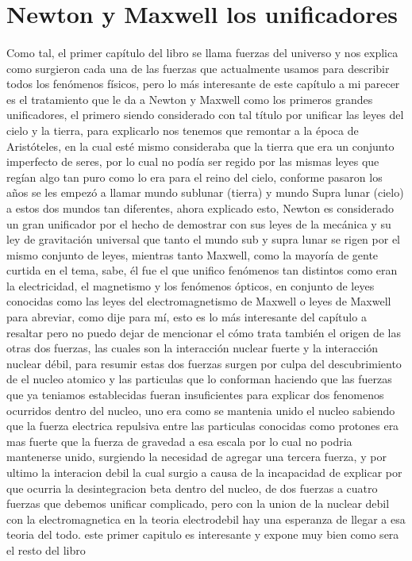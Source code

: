 \documentclass[12pt]{article}
\begin{document}
\section*{Newton y Maxwell los unificadores}
\paragraph*{}
\textsf{Como tal, el primer capítulo del libro se llama fuerzas del universo y nos explica como surgieron cada una de las fuerzas
que actualmente usamos para describir todos los fenómenos físicos, pero lo más interesante de este capítulo a mi parecer es
el tratamiento que le da a Newton y Maxwell como los primeros grandes unificadores, el primero siendo considerado con tal título por 
unificar las leyes del cielo y la tierra, para explicarlo nos tenemos que remontar a la época de Aristóteles, en la cual esté mismo
consideraba que la tierra que era un conjunto imperfecto de seres, por lo cual no podía ser regido por las mismas leyes que regían 
algo tan puro como lo era para el reino del cielo, conforme pasaron los años se les empezó a llamar mundo sublunar (tierra) y mundo 
Supra lunar (cielo) a estos dos mundos tan diferentes, ahora explicado esto, Newton es considerado un gran unificador por el hecho de 
demostrar con sus leyes de la mecánica y su ley de gravitación universal que tanto el mundo sub y supra lunar se rigen por el mismo 
conjunto de leyes, mientras tanto Maxwell, como la mayoría de gente curtida en el tema, sabe, él fue el que unifico fenómenos tan 
distintos como eran la electricidad, el magnetismo y los fenómenos ópticos, en conjunto de leyes conocidas como las leyes del 
electromagnetismo de Maxwell o leyes de Maxwell para abreviar, como dije para mí, esto es lo más interesante del capítulo a resaltar
pero no puedo dejar de mencionar el cómo trata también el origen de las otras dos fuerzas, las cuales son la interacción nuclear fuerte y
la interacción nuclear débil, para resumir estas dos fuerzas surgen por culpa del descubrimiento de el nucleo atomico y las particulas que 
lo conforman haciendo que las fuerzas que ya teniamos establecidas fueran insuficientes para explicar dos fenomenos ocurridos dentro del nucleo,
uno era como se mantenia unido el nucleo sabiendo que la fuerza electrica repulsiva entre las particulas conocidas como protones era mas fuerte
que la fuerza de gravedad a esa escala por lo cual no podria mantenerse unido, surgiendo la necesidad de agregar una tercera fuerza, y por ultimo
la interacion debil la cual surgio a causa de la incapacidad de explicar por que ocurria la desintegracion beta dentro del nucleo, de dos fuerzas
a cuatro fuerzas que debemos unificar complicado, pero con la union de la nuclear debil con la electromagnetica en la teoria electrodebil hay una
esperanza de llegar a esa teoria del todo. este primer capitulo es interesante y expone muy bien como sera el resto del libro}
\end{document}
